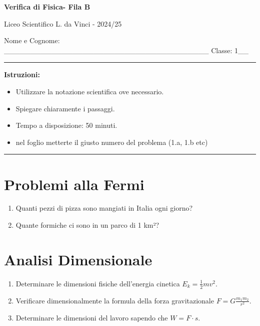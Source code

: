 \documentclass[12pt]{article}
\begin{document}
\begin{center}
    \textbf{\Large Verifica di Fisica- Fila B}
    \vspace{0.25cm}
    
    Liceo Scientifico L. da Vinci - 2024/25
    \vspace{0.25cm}
    
\end{center}
Nome e Cognome: \_\_\_\_\_\_\_\_\_\_\_\_\_\_\_\_\_\_\_\_\_\_\_\_\_\_\_\_\_\_\_\_\_\_\_\_\_\_\_ 
 \hspace{4cm} Classe: 1\_\_
\vspace{0.5cm}
\hrule
\vspace{0.5cm}

\textbf{Istruzioni:} 
\begin{itemize}
    \item Utilizzare la notazione scientifica ove necessario.
    \item Spiegare chiaramente i passaggi.
    \item Tempo a disposizione: 50 minuti.
    \item nel foglio metterte il giusto numero del problema (1.a, 1.b etc)
\end{itemize}
\hrule
\vspace{0.5cm}

\section{Problemi alla Fermi}
    
    \begin{enumerate}[label=\alph*)]
        \item Quanti pezzi di pizza sono mangiati in Italia ogni giorno?
        \item Quante formiche ci sono in un parco di 1 km²?
    \end{enumerate}

\section{Analisi Dimensionale}
    \begin{enumerate}[label=\alph*)]
        \item Determinare le dimensioni fisiche dell'energia cinetica $E_k = \frac{1}{2}mv^2$.
        \item Verificare dimensionalmente la formula della forza gravitazionale $F = G\frac{m_1 m_2}{r^2}$.
        \item Determinare le dimensioni del lavoro sapendo che $W = F \cdot s$.
    \end{enumerate}
\end{document}

